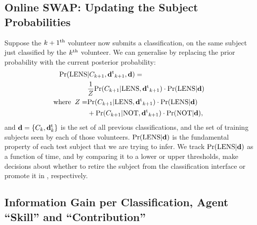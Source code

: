 \documentclass[useAMS,usenatbib,a4paper]{mn2e}
\begin{document}
\subsection{Online SWAP: Updating the Subject Probabilities}
\label{appendix:swap:examples}

Suppose the $k+1^{\rm th}$ volunteer now submits a classification, on the same
subject just classified by the $k^{\rm th}$ volunteer. We can generalise
 by replacing the prior probability with the current
posterior probability:
\begin{align}
  \label{eq:app:update}
  {\rm Pr}({\rm LENS} & |C_{k+1},{\mathbf{d}^{\rm t}}_{k+1},{\mathbf{d}}) = \\
  & \frac{1}{Z} {\rm Pr}(C_{k+1}|{\rm LENS},{\mathbf{d}^{\rm t}}_{k+1}) \cdot {\rm Pr}({\rm LENS}|{\mathbf{d}}) \\ \notag
{\rm where}\;\; Z = & {\rm Pr}(C_{k+1}|{\rm LENS},{\mathbf{d}^{\rm t}}_{k+1})\cdot{\rm Pr}({\rm LENS}|{\mathbf{d}}) \\ \notag
      & + {\rm Pr}(C_{k+1}|{\rm NOT},{\mathbf{d}^{\rm t}}_{k+1})\cdot{\rm Pr}({\rm NOT}|{\mathbf{d}}), \notag
\end{align}
and ${\mathbf{d}} = \{C_k,{\mathbf{d}^{\rm t}_k}\}$ is the set of all previous
classifications, and the set of training subjects seen by each of those
volunteers.
${\rm Pr}({\rm LENS}|{\mathbf{d}})$ is the fundamental property of each test subject that
we are trying to infer. We track ${\rm Pr}({\rm LENS}|{\mathbf{d}})$ as a function of time,
and by comparing it to a lower or upper thresholds, make decisions about
whether to retire the subject from the classification interface or
promote it in \Talk, respectively.


\subsection{Information Gain per Classification, Agent ``Skill'' and ``Contribution''}
\label{appendix:swap:examples}
\end{document}
